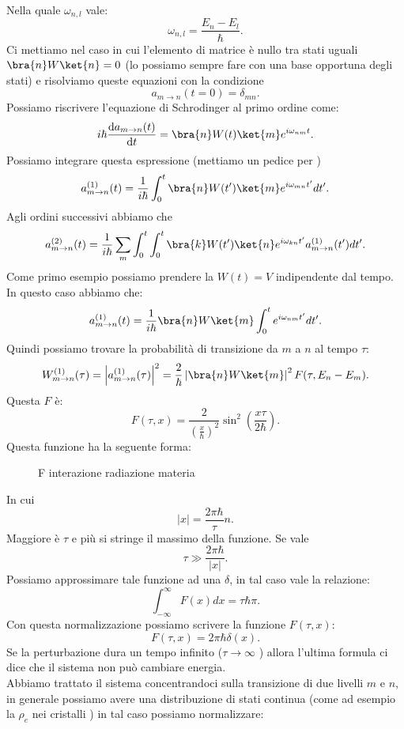 Nella quale $\omega_{n,l}$  vale:
\[
\omega_{n,l}=\frac{E_n-E_l}{\hbar }
.\] 
Ci mettiamo nel caso in cui l'elemento di matrice è nullo tra stati uguali $\bra{n}W\ket{n} = 0$ (lo possiamo sempre fare con una base opportuna degli stati) e risolviamo queste equazioni con la condizione 
\[
    a_{m\to n}(t=0) = \delta_{mn}
.\] 
Possiamo riscrivere l'equazione di Schrodinger al primo ordine come:
\[
    i\hbar \frac{\text{d} a_{m\to n}(t) }{\text{d} t} 
    =
    \bra{n}W(t) \ket{m}e^{i\omega_{nm}t }
.\] 
Possiamo integrare questa espressione (mettiamo un pedice per ) 
\[
    a_{m\to n}^{(1) } (t) =
    \frac{1}{i\hbar }
    \int_{0}^{t} \bra{n}W(t')\ket{m}e^{i\omega_{mn}t'} dt'
.\] 
Agli ordini successivi abbiamo che
\[
    a_{m\to n}^{(2)}(t)=
    \frac{1}{i\hbar }
    \sum_{m}^{} \int_{0}^{t}  
    \int_{0}^{t} \bra{k}W(t')\ket{n}e^{i\omega_{kn}t'}a_{m\to n}^{(1)}(t')  dt'
.\] 
Come primo esempio possiamo prendere la $W(t) = V$  indipendente dal tempo. In questo caso abbiamo che:
\[
    a_{m\to n}^{(1)}(t) =
    \frac{1}{i\hbar }\bra{n}W \ket{m} \int_{0}^{t} e^{i\omega_{nm}t'}dt'
.\] 
Quindi possiamo trovare la probabilità di transizione da $m$ a $n$ al tempo $\tau$:
\[
    W^{(1)}_{m\to n}(\tau)=
    \left|a_{m\to n}^{(1)}(\tau) \right|^2 = \frac{2}{\hbar }\left|\bra{n}W \ket{m}\right|^2F(\tau,E_n-E_m) 
.\] 
Questa $F$ è:
\[
    F(\tau,x) = \frac{2}{\left(\frac{x}{\hbar }\right)^2}\sin^2\left(\frac{x\tau}{2\hbar }\right) 
.\] 
Questa funzione ha la seguente forma:
\begin{figure}[H]
    \centering
    \caption{F interazione radiazione materia}
    \label{fig:f-interazione-radiazione-materia}
\end{figure}
In cui 
\[
\left|x\right|=\frac{2\pi\hbar }{\tau}n
.\] 
Maggiore è $\tau$ e più si stringe il massimo della funzione. Se vale
\[
\tau \gg \frac{2\pi\hbar }{\left|x\right|} 
.\] 
Possiamo approssimare tale funzione ad una $\delta$, in tal caso vale la relazione:
\[
    \int_{-\infty}^{\infty} F(x) dx = \tau \hbar \pi 
.\] 
Con questa normalizzazione possiamo scrivere la funzione $F(\tau,x)$: 
\[
    F(\tau,x) =2\pi\hbar \delta (x)  
.\] 
Se la perturbazione dura un tempo infinito ($\tau\to \infty$ ) allora l'ultima formula ci dice che il sistema non può cambiare energia. \\
Abbiamo trattato il sistema concentrandoci sulla transizione di due livelli $m$ e $n$, in generale possiamo avere una distribuzione di stati continua (come ad esempio la $\rho_e$ nei cristalli ) in tal caso possiamo normalizzare:
